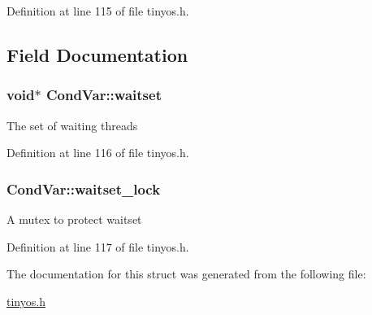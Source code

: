 Definition at line 115 of file tinyos.\-h.



\subsection{Field Documentation}
\hypertarget{structCondVar_a7da9e0169713c3b3ae386a8ab49f7e34}{
\subsubsection[{waitset}]{\setlength{\rightskip}{0pt plus 5cm}void$\ast$ Cond\-Var\-::waitset}}\label{structCondVar_a7da9e0169713c3b3ae386a8ab49f7e34}
The set of waiting threads 

Definition at line 116 of file tinyos.\-h.

\hypertarget{structCondVar_a477b855f4d3880d231206ae79bd5b6cf}{
\subsubsection[{waitset\-\_\-lock}]{ Cond\-Var\-::waitset\-\_\-lock}}\label{structCondVar_a477b855f4d3880d231206ae79bd5b6cf}
A mutex to protect {\ttfamily waitset} 

Definition at line 117 of file tinyos.\-h.



The documentation for this struct was generated from the following file\-:\begin{DoxyCompactItemize}
\item 
\hyperlink{tinyos_8h}{tinyos.\-h}\end{DoxyCompactItemize}
